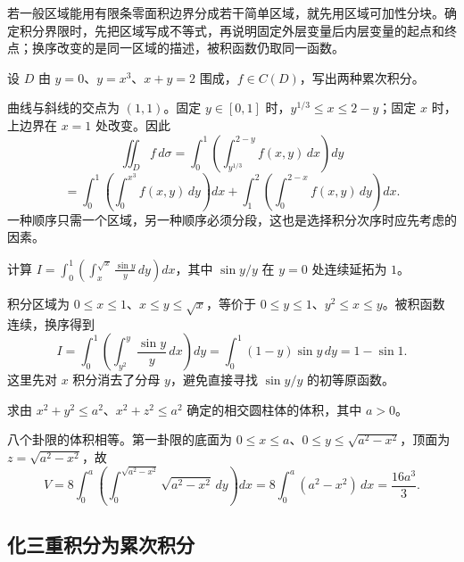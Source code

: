 \documentclass[UTF8,12pt,a4paper,fontset=fandol]{ctexbook}
\begin{document}
若一般区域能用有限条零面积边界分成若干简单区域，就先用区域可加性分块。确定积分界限时，先把区域写成不等式，再说明固定外层变量后内层变量的起点和终点；换序改变的是同一区域的描述，被积函数仍取同一函数。

\begin{example}
\label{ex:multiple-cubic-line-domain}
设 $D$ 由 $y=0$、$y=x^3$、$x+y=2$ 围成，$f\in C(D)$，写出两种累次积分。
\end{example}
\begin{solve}
曲线与斜线的交点为 $(1,1)$。固定 $y\in[0,1]$ 时，$y^{1/3}\leq x\leq2-y$；固定 $x$ 时，上边界在 $x=1$ 处改变。因此
\[
    \iint_Df\,d\sigma
    =\int_0^1\left(\int_{y^{1/3}}^{2-y}f(x,y)\,dx\right)dy
\]
\[
    =\int_0^1\left(\int_0^{x^3}f(x,y)\,dy\right)dx
    +\int_1^2\left(\int_0^{2-x}f(x,y)\,dy\right)dx.
\]
一种顺序只需一个区域，另一种顺序必须分段，这也是选择积分次序时应先考虑的因素。
\end{solve}

\begin{example}
\label{ex:multiple-change-order-sinc}
计算 $\displaystyle I=\int_0^1\left(\int_x^{\sqrt x}\frac{\sin y}{y}\,dy\right)dx$，其中 $\sin y/y$ 在 $y=0$ 处连续延拓为 $1$。
\end{example}
\begin{solve}
积分区域为 $0\leq x\leq1$、$x\leq y\leq\sqrt x$，等价于 $0\leq y\leq1$、$y^2\leq x\leq y$。被积函数连续，换序得到
\[
    I=\int_0^1\left(\int_{y^2}^y\frac{\sin y}{y}\,dx\right)dy
    =\int_0^1(1-y)\sin y\,dy=1-\sin1.
\]
这里先对 $x$ 积分消去了分母 $y$，避免直接寻找 $\sin y/y$ 的初等原函数。
\end{solve}

\begin{example}
\label{ex:multiple-two-cylinders-volume}
求由 $x^2+y^2\leq a^2$、$x^2+z^2\leq a^2$ 确定的相交圆柱体的体积，其中 $a>0$。
\end{example}
\begin{solve}
八个卦限的体积相等。第一卦限的底面为 $0\leq x\leq a$、$0\leq y\leq\sqrt{a^2-x^2}$，顶面为 $z=\sqrt{a^2-x^2}$，故
\[
    V=8\int_0^a\left(\int_0^{\sqrt{a^2-x^2}}\sqrt{a^2-x^2}\,dy\right)dx
    =8\int_0^a(a^2-x^2)\,dx=\frac{16a^3}{3}.
\]
\end{solve}

\subsection{化三重积分为累次积分}
\label{subsec:reduction-of-triple-integrals-to-iterated-integrals}
\end{document}
